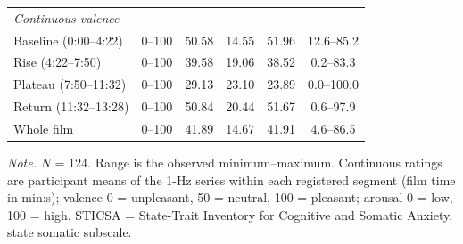 \begin{table}[tbp]
\begin{threeparttable}
\begin{tabular}{@{}lccccc@{}}
\multicolumn{6}{l}{\textit{Continuous valence}} \\
\hspace{1em}Baseline (0:00--4:22) & 0--100 & 50.58 & 14.55 & 51.96 & 12.6--85.2 \\
\hspace{1em}Rise (4:22--7:50) & 0--100 & 39.58 & 19.06 & 38.52 & 0.2--83.3 \\
\hspace{1em}Plateau (7:50--11:32) & 0--100 & 29.13 & 23.10 & 23.89 & 0.0--100.0 \\
\hspace{1em}Return (11:32--13:28) & 0--100 & 50.84 & 20.44 & 51.67 & 0.6--97.9 \\
\hspace{1em}Whole film & 0--100 & 41.89 & 14.67 & 41.91 & 4.6--86.5 \\
\bottomrule
\end{tabular}
\vspace{4pt}
\begin{tablenotes}
{\small\textit{Note.} $N$ = 124. Range is the observed minimum--maximum. Continuous ratings are participant means of the 1-Hz series within each registered segment (film time in min:s); valence 0 = unpleasant, 50 = neutral, 100 = pleasant; arousal 0 = low, 100 = high. STICSA = State-Trait Inventory for Cognitive and Somatic Anxiety, state somatic subscale.}
\end{tablenotes}
\end{threeparttable}
\end{table}
